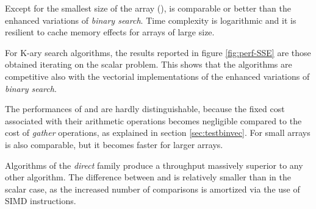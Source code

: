 \documentclass[preprint,1p,times]{elsarticle}
\begin{document}
Except for the smallest size of the array  (), \textit{\MKLName} is comparable or better than the enhanced variations of \textit{binary search}. Time complexity is logarithmic and it is resilient to cache memory effects for arrays  of large size.

For {K-ary search} algorithms, the results reported in figure \ref{fig:perf-SSE} are those obtained iterating on the scalar problem. This shows that the algorithms are competitive also with the vectorial implementations of the enhanced variations of \textit{binary search}.

The performances of \textit{\ClassicOffsetName} and \textit{\BitSetName} are hardly distinguishable, because the fixed cost associated with their arithmetic operations becomes negligible compared to the cost of \textit{gather} operations, as explained in section \ref{sec:testbinvec}. For small arrays \textit{\EytzingerName} is also comparable, but it becomes faster for larger arrays.

Algorithms of the \textit{direct} family produce a throughput massively superior to any other algorithm. The difference between \textit{\DirectName} and \textit{\DirectGapName} is relatively smaller than in the scalar case, as the increased number of comparisons is amortized via the use of SIMD instructions. 
\end{document}
